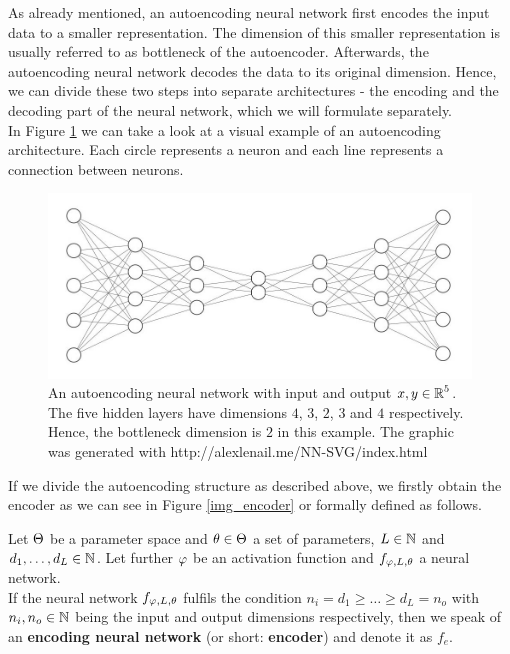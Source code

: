 As already mentioned, an autoencoding neural network first encodes the input data to a smaller representation. The dimension of this smaller representation is usually referred to as bottleneck of the autoencoder.
Afterwards, the autoencoding neural network decodes the data to its original dimension. Hence, we can divide these two steps into separate architectures - the encoding and the decoding part of the neural network, which we will formulate separately.\\
In Figure \ref{fig:autoencoder} we can take a look at a visual example of an autoencoding architecture. Each circle represents a neuron and each line represents a connection between neurons.


\begin{figure}
\begin{center}
   \begin{minipage}[b]{0.9\linewidth}
      \includegraphics[width=\linewidth]{autoencoder}
      \caption{An autoencoding neural network with input and output $x, y\in \operatorname{\mathbb{R}}^5$. The five hidden layers have dimensions $4$, $3$, $2$, $3$ and $4$ respectively. Hence, the bottleneck dimension is $2$ in this example. The graphic was generated with http://alexlenail.me/NN-SVG/index.html}\label{fig:autoencoder}
	\end{minipage}
\end{center}
\end{figure}


If we divide the autoencoding structure as described above, we firstly obtain the encoder as we can see in Figure \ref{img_encoder} or formally defined as follows.

\begin{definition}\label{def_encoder}
Let $\operatorname{\Theta}$ be a parameter space and $\theta \in \operatorname{\Theta}$ a set of parameters, $L\in \operatorname{\mathbb{N}}$ and $d_1,\ldots, d_L\in\operatorname{\mathbb{N}}$. Let further $\operatorname{\varphi}$ be an activation function and $f_{\operatorname{\varphi},L,\theta}$ a neural network.\\
If the neural network $f_{\operatorname{\varphi},L,\theta}$ fulfils the condition $n_i= d_1 \geq \ldots \geq d_L = n_o$ with $n_i, n_o \in \operatorname{\mathbb{N}}$ being the input and output dimensions respectively, then we speak of an \textbf{encoding neural network} (or short: \textbf{encoder}) and denote it as $f_e$.
\end{definition}


